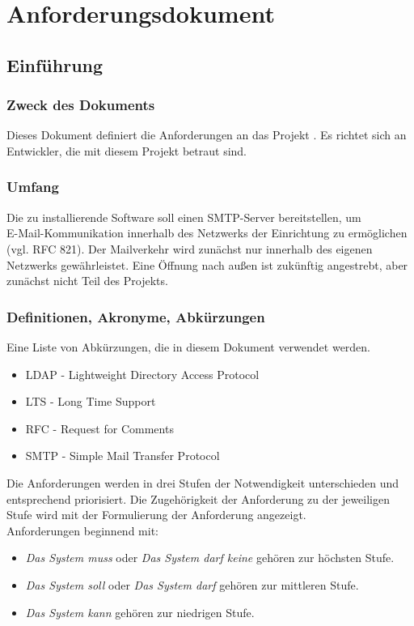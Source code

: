 \appendix
\renewcommand\chaptername{Anhang}


\chapter{Anforderungsdokument}
\label{ch:Anhang}

\section{Einführung}
\subsection{Zweck des Dokuments}
Dieses Dokument definiert die Anforderungen an das Projekt . 
Es richtet sich an Entwickler, die mit diesem Projekt betraut sind.

\subsection{Umfang}
Die zu installierende Software soll einen SMTP-Server bereitstellen, um \\
E-Mail-Kommunikation innerhalb des Netzwerks der Einrichtung zu ermöglichen (vgl. RFC 821). Der Mailverkehr wird zunächst nur innerhalb des eigenen Netzwerks gewährleistet. Eine Öffnung nach außen ist zukünftig angestrebt, aber zunächst nicht Teil des Projekts.

\subsection{Definitionen, Akronyme, Abkürzungen}
\label{ch:Definition}
Eine Liste von Abkürzungen, die in diesem Dokument verwendet werden.
\begin{itemize}
	\item LDAP - Lightweight Directory Access Protocol
	\item LTS - Long Time Support
	\item RFC - Request for Comments
	\item SMTP - Simple Mail Transfer Protocol
\end{itemize}

Die Anforderungen werden in drei Stufen der Notwendigkeit unterschieden und entsprechend priorisiert. Die Zugehörigkeit der Anforderung zu der jeweiligen Stufe wird mit der Formulierung der Anforderung angezeigt.\\
Anforderungen beginnend mit:
\begin{itemize}
	\item \textit{Das System muss} oder \textit{Das System darf keine} gehören zur höchsten Stufe.
	\item \textit{Das System soll} oder \textit{Das System darf} gehören zur mittleren Stufe.
	\item \textit{Das System kann} gehören zur niedrigen Stufe.
\end{itemize}

